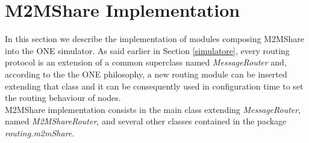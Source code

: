 \section{M2MShare Implementation}
In this section we describe the implementation of modules composing M2MShare into the ONE simulator. As said earlier in Section \ref{simulatore}, every routing protocol is an extension of a common superclass named \textit{MessageRouter} and, according to the the ONE philosophy, a new routing module can be inserted extending that class and it can be consequently used in configuration time to set the routing behaviour of nodes.
\\

M2MShare implementation consists in the main class extending \textit{MessageRouter}, named \textit{M2MShareRouter}, and several other classes contained in the package \textit{routing.m2mShare}.

